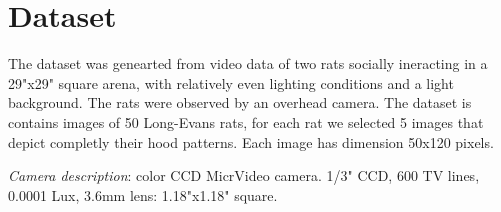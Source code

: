 \documentclass[conference,10pt,times,letter]{IEEEtran}
\begin{document}


  





\section{Dataset}
\label{sec:dataset}

The dataset was genearted from video data of two rats socially ineracting in a 29"x29" square arena, with relatively even lighting conditions and a light background. The rats were observed by an overhead camera.
The dataset is contains images of 50 Long-Evans rats, for each rat we selected 5 images that depict completly their hood patterns. Each image has dimension 50x120 pixels.


\textit{Camera description}: color CCD MicrVideo camera. 1/3" CCD, 600 TV lines, 0.0001 Lux, 3.6mm lens: 1.18"x1.18" square.
\end{document}
